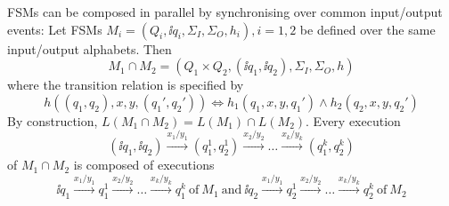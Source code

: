 FSMs can be composed in parallel by synchronising over common input/output events:
Let FSMs $M_i=(Q_i, \ii{q_i}, \Sigma_I, \Sigma_O,  h_i), i = 1,2$ be defined over
the same input/output alphabets. Then
$$
M_1 \cap M_2 = (Q_1\times Q_2, (\ii{q_1},\ii{q_2}),\Sigma_I, \Sigma_O, h)
$$
where the transition relation is specified by
$$
h((q_1,q_2),x,y,(q_1',q_2')) \Leftrightarrow h_1(q_1,x,y,q_1') \wedge h_2(q_2,x,y,q_2')
$$
By construction, $L(M_1 \cap M_2) = L(M_1) \cap L(M_2)$. Every execution
$$
(\ii{q_1},\ii{q_2}) \xrightarrow{x_1/y_1} (q_1^1,q_2^1)
\xrightarrow{x_2/y_2} \dots \xrightarrow{x_k/y_k} (q_1^{k},q_2^{k})
$$
of
$M_1\cap M_2$
is composed of executions
$$
\ii{q_1} \xrightarrow{x_1/y_1} q_1^1
\xrightarrow{x_2/y_2} \dots \xrightarrow{x_k/y_k} q_1^{k}\
\text{of}\ M_1\ \text{and}\
\ii{q_2} \xrightarrow{x_1/y_1} q_2^1
\xrightarrow{x_2/y_2} \dots \xrightarrow{x_k/y_k} q_2^{k}\
\text{of}\ M_2
$$
